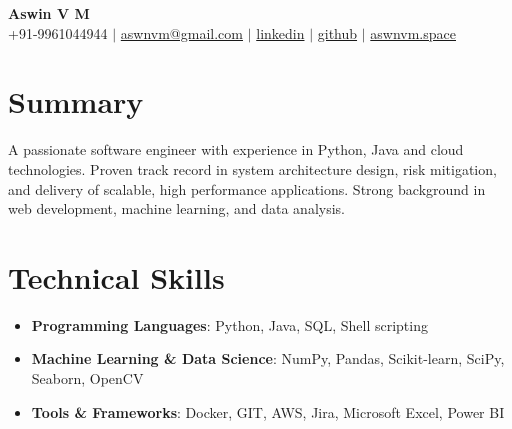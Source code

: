 \documentclass[letterpaper,10pt]{article}
\newcommand{\resumeItem}[1]{\item\small{#1}}
\newcommand{\resumeSubHeadingList}{\begin{itemize}[leftmargin=0.15in, label={}]}
\newcommand{\resumeSubHeadingListEnd}{\end{itemize}}
\begin{document}
\begin{center}
  \textbf{\Huge Aswin V M} \\
  \small +91-9961044944 $|$ \href{mailto:aswnvm@gmail.com}{aswnvm@gmail.com} $|$
  \href{https://linkedin.com/in/aswin-vm}{linkedin} $|$
  \href{https://github.com/aswnvm}{github} $|$
  \href{https://aswnvm.space}{aswnvm.space}
\end{center}

\section*{Summary}
A passionate software engineer with experience in Python, Java and cloud technologies. Proven track record in system architecture design, risk mitigation, and delivery of scalable, high performance applications. Strong background in web development, machine learning, and data analysis.

\section{Technical Skills}
\resumeSubHeadingList
\resumeItem{\textbf{Programming Languages}: Python, Java, SQL, Shell scripting}
\resumeItem{\textbf{Machine Learning \& Data Science}: NumPy, Pandas, Scikit-learn, SciPy,  Seaborn, OpenCV}

\resumeItem{\textbf{Tools \& Frameworks}: Docker, GIT, AWS, Jira, Microsoft Excel, Power BI}
\resumeSubHeadingListEnd
\end{document}
